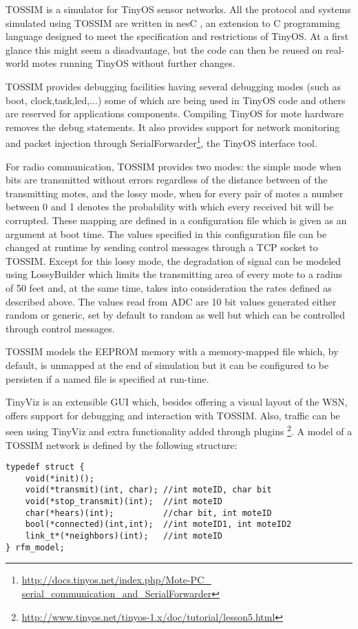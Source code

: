\label{subsec:tossim}
TOSSIM\cite{tossim} is a simulator for TinyOS sensor networks.
All the protocol and systems simulated using TOSSIM are written in nesC \cite{nesC},
an extension to C programming language designed to meet the specification and 
restrictions of TinyOS. At a first glance this might seem a disadvantage, but 
the code can then be reused on real-world motes running TinyOS
without further changes.

TOSSIM provides debugging facilities having several debugging modes 
(such as boot, clock,task,led,...) some of which are being used in TinyOS code
and others are reserved for applications components. Compiling TinyOS for mote
hardware removes the debug statements.
It also provides support for network monitoring and packet injection
through SerialForwarder\footnote{\url{http://docs.tinyos.net/index.php/Mote-PC_
serial_communication_and_SerialForwarder}}, the TinyOS interface tool.

For radio communication, TOSSIM provides two modes: the simple mode when bits
are transmitted without errors regardless of the distance between of the transmitting
motes, and the lossy mode, when for every pair of motes a number between 0 and 1 
denotes the probability with which every received bit will be corrupted. These 
mapping are defined in a configuration file which is given as an argument at boot
time. The values specified in this configuration file can be changed at runtime
by sending control messages through a TCP socket to TOSSIM.
 Except for this lossy mode, the degradation of signal can be modeled using
LossyBuilder which limits the transmitting area of every mote to a radius of 50
 feet and, at the same time, takes into consideration the rates defined as 
described above.
The values read from ADC are 10 bit values generated either random or generic, set
by default to random as well but which can be controlled through control messages.

TOSSIM models the EEPROM memory with a memory-mapped file which, by default, is
unmapped at the end of simulation but it can be configured to be persisten if a
named file is specified at run-time.

TinyViz is an extensible GUI which, besides offering a visual layout of the 
WSN, offers support for debugging and interaction with TOSSIM. Also, traffic can
be seen using TinyViz and extra functionality added through plugins
\footnote{\url{http://www.tinyos.net/tinyos-1.x/doc/tutorial/lesson5.html}}.
A model of a TOSSIM network is defined by the following structure:
\begin{lstlisting}
typedef struct {
    void(*init)();
    void(*transmit)(int, char); //int moteID, char bit
    void(*stop_transmit)(int);  //int moteID
    char(*hears)(int);          //char bit, int moteID
    bool(*connected)(int,int);  //int moteID1, int moteID2
    link_t*(*neighbors)(int);   //int moteID
} rfm_model;
\end{lstlisting}

